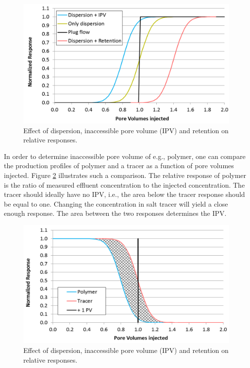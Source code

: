 \begin{figure}[h!]
    \centering
    \includegraphics[width=\textwidth]{img/fig/ipvRet1.png}
    \caption{Effect of dispersion, inaccessible pore volume (IPV) and retention on relative responses.}
    \label{fig:ipvRet1} %
\end{figure}

In order to determine inaccessible pore volume of e.g., polymer, one can compare the production profiles of polymer and a tracer as a function of pore volumes injected. Figure \ref{fig:ipvRet2} illustrates such a comparison. The relative response of polymer is the ratio of measured effluent concentration to the injected concentration. The tracer should ideally have no IPV, i.e., the area below the tracer response should be equal to one. Changing the concentration in salt tracer will yield a close enough response. The area between the two responses determines the IPV.

\begin{figure}[h!]
    \centering
    \includegraphics[width=\textwidth]{img/fig/ipvRet2.png}
    \caption{Effect of dispersion, inaccessible pore volume (IPV) and retention on relative responses.}
    \label{fig:ipvRet2} %
\end{figure}

